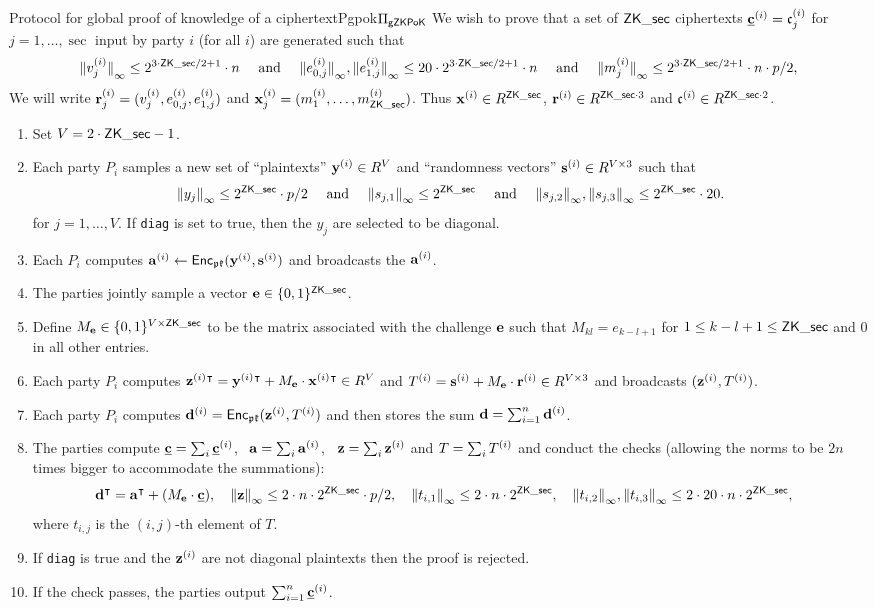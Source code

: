 \begin{Boxfig}{Protocol for global proof of knowledge of a ciphertext}{Pgpok}{$\Pi_\mathsf{gZKPoK}$}
We wish to prove that a set of $\mathsf{ZK\_sec}$ ciphertexts $\underline{\mathbf{c}}^{(i)}=\mathfrak{c}^{(i)}_j$ for $j=1,\ldots, \sec$
input by party $i$ (for all $i$) are generated such that
\[ {\Vert v^{(i)}_j \Vert}_\infty \le 2^{3 \cdot \mathsf{ZK\_sec}/2+1} \cdot n \quad 
    \mbox{  and  } \quad
   {\Vert e^{(i)}_{0,j} \Vert}_\infty, {\Vert e^{(i)}_{1,j} \Vert}_\infty \le 20 \cdot 2^{3 \cdot \mathsf{ZK\_sec}/2+1} \cdot n \quad
    \mbox{  and  } \quad
   {\Vert m^{(i)}_j \Vert}_\infty \le 2^{3 \cdot \mathsf{ZK\_sec}/2+1} \cdot n \cdot p/2,
\]
We will write $\mathbf{r}^{(i)}_j=(v^{(i)}_j, e^{(i)}_{0,j}, e^{(i)}_{1,j})$
and $\mathbf{x}^{(i)}_j=(m^{(i)}_1,\ldots,m^{(i)}_{\mathsf{ZK\_sec}})$.
Thus $\mathbf{x}^{(i)} \in R^{\mathsf{ZK\_sec}}$, $\mathbf{r}^{(i)} \in R^{\mathsf{ZK\_sec} \cdot 3}$ and $\mathfrak{c}^{(i)}\in R^{\mathsf{ZK\_sec} \cdot 2}$.
\begin{enumerate}
\item Set $V= 2 \cdot \mathsf{ZK\_sec}-1$.
\item \label{stage1} 
Each party $P_i$ samples a new set of ``plaintexts'' $\mathbf{y}^{(i)} \in R^V$ and ``randomness vectors''
$\mathbf{s}^{(i)} \in R^{V \times 3} $ such that
\[ {\Vert y_j \Vert}_\infty \le 2^{\mathsf{ZK\_sec}} \cdot p/2 \quad \mbox{  and  } \quad
   {\Vert s_{j,1} \Vert}_\infty \le 2^{\mathsf{ZK\_sec}} \quad \mbox{  and   } \quad
   {\Vert s_{j,2} \Vert}_\infty, {\Vert s_{j,3} \Vert}_\infty \le 2^{\mathsf{ZK\_sec}} \cdot 20.
\]
for $j=1,\ldots,V$.
If \verb+diag+ is set to true, then the $y_j$ are selected to be diagonal.
\item Each $P_i$ computes $\mathbf{a}^{(i)} \leftarrow \mathsf{Enc}_{\mathfrak{pk}}(\mathbf{y}^{(i)},\mathbf{s}^{(i)})$ and broadcasts the $\mathbf{a}^{(i)}$.
\item The parties jointly sample a vector $\mathbf{e} \in \{0,1\}^{\mathsf{ZK\_sec}}$.
\item Define $M_{\mathbf{e}} \in \{0,1\}^{V \times \mathsf{ZK\_sec}}$ to be the matrix associated with the challenge $\mathbf{e}$ 
such that $M_{kl} = e_{k-l+1}$ for $1 \leq k-l+1 \leq \mathsf{ZK\_sec}$ and $0$ in all other entries.
\item Each party $P_i$ computes $\mathbf{z}^{(i)}{}^{\intercal} = \mathbf{y}^{(i)}{}^{\intercal} + M_{\mathbf{e}} \cdot \mathbf{x}^{(i)}{}^{\intercal} \in R^{V}$ 
and $T^{(i)}=\mathbf{s}^{(i)} + M_{\mathbf{e}} \cdot \mathbf{r}^{(i)} \in R^{V \times 3}$ and broadcasts $(\mathbf{z}^{(i)},T^{(i)})$.
\item \label{stage20} Each party $P_i$ computes $\mathbf{d}^{(i)} = \mathsf{Enc}_{\mathfrak{pk}}(\mathbf{z}^{(i)}, T^{(i)})$ 
and then stores the sum $\mathbf{d} = \sum_{i=1}^n \mathbf{d}^{(i)}$.
\item \label{stage21} 
The parties compute $\underline{\mathbf{c}} =\sum_i \underline{\mathbf{c}}^{(i)}$,~ $\mathbf{a} = \sum_i \mathbf{a}^{(i)}$,~ $\mathbf{z} = \sum_i \mathbf{z}^{(i)}$ and $T = \sum_i T^{(i)}$ and 
conduct the checks (allowing the norms to be $2n$ times bigger to accommodate the summations):
\[\mathbf{d}^{\intercal} = \mathbf{a}^{\intercal} + (M_{\mathbf{e}} \cdot \underline{\mathbf{c}}), \quad
  {\Vert \mathbf{z}\Vert}_\infty \leq 2 \cdot n \cdot 2^{\mathsf{ZK\_sec}} \cdot p/2, \quad
  {\Vert t_{i,1} \Vert}_\infty \leq 2 \cdot n \cdot 2^{\mathsf{ZK\_sec}}, \quad
  {\Vert t_{i,2} \Vert}_\infty, {\Vert t_{i,3} \Vert}_\infty \leq 2 \cdot 20 \cdot n \cdot 2^{\mathsf{ZK\_sec}}, \quad
\]
where $t_{i,j}$ is the $(i,j)$-th element of $T$.
\item If \verb+diag+ is true and the $\mathbf{z}^{(i)}$ are not diagonal plaintexts then the
proof is rejected.
\item If the check passes, the parties output $\sum_{i=1}^{n} \underline{\mathbf{c}}^{(i)}$.
  \end{enumerate}
\end{Boxfig}
